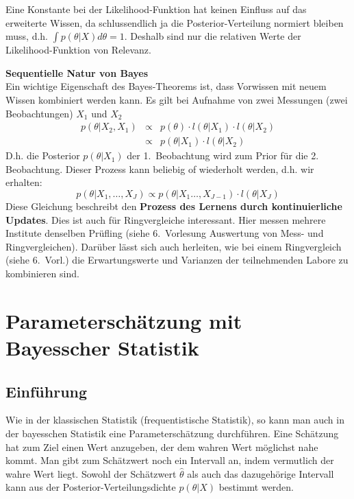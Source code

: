Eine Konstante  bei der Likelihood-Funktion hat keinen Einfluss auf das erweiterte
Wissen, da schlussendlich ja die Posterior-Verteilung normiert bleiben muss, d.h.
$\int p(\theta|X) d\theta =1$. Deshalb sind nur die relativen Werte der Likelihood-Funktion von Relevanz.

\textbf{Sequentielle Natur von Bayes} \\
Ein wichtige Eigenschaft des Bayes-Theorems ist, dass Vorwissen mit
neuem Wissen kombiniert werden kann. Es gilt bei Aufnahme von zwei
Messungen (zwei Beobachtungen) $X_1$ und $X_2$
\[
\begin{array}{rcl}
p(\theta|X_2,X_1) &\propto& p(\theta) \cdot l(\theta|X_1) \cdot l(\theta | X_2) \\
&\propto& p(\theta|X_1) \cdot l(\theta|X_2)
\end{array}
\]
D.h. die Posterior $p(\theta|X_1)$ der 1.~Beobachtung wird zum Prior für die
2. Beobachtung. Dieser Prozess kann beliebig of wiederholt werden, d.h. wir
erhalten:
\begin{equation}
p(\theta |X_1,\hdots,X_J) \propto p(\theta | X_1\hdots, X_{J-1}) \cdot l(\theta | X_J)
\label{eq:Bayes_sequentiell}
\end{equation}
Diese Gleichung beschreibt den \textbf{Prozess des Lernens durch kontinuierliche Updates}. Dies ist auch für Ringvergleiche interessant. Hier messen mehrere
Institute denselben Prüfling (siehe 6.~Vorlesung \glqq Auswertung von Mess- und Ringvergleichen\grqq). Darüber lässt sich auch herleiten, wie bei einem Ringvergleich (siehe 6.~Vorl.) die Erwartungswerte und Varianzen der teilnehmenden Labore zu kombinieren sind.

\section{Parameterschätzung mit Bayesscher Statistik}
\subsection{Einführung}
Wie in der klassischen Statistik (frequentistische Statistik), so kann man auch in der bayes\-schen Statistik eine Parameterschätzung durchführen. Eine Schätzung hat zum Ziel einen Wert anzugeben, der dem wahren Wert möglichst nahe kommt. Man gibt zum Schätzwert noch ein Intervall  an, indem vermutlich der wahre Wert liegt. Sowohl der Schätzwert $\hat{\theta}$ als auch das dazugehörige Intervall kann aus der Posterior-Ver\-teilungs\-dichte $p(\theta|X)$ bestimmt werden.
